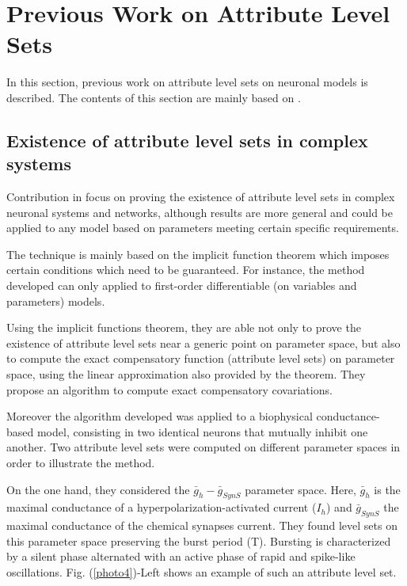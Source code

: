 \chapter{Previous Work on Attribute Level Sets}
\label{sec:prev}
In this section, previous work on attribute level sets on neuronal models is described. The contents of this section are mainly based on \cite{Oly,Rot,Iii2019}. 
\section{Existence of attribute level sets in complex systems}
Contribution in \cite{Oly} focus on proving the existence of attribute level sets in complex neuronal systems and networks, although results are more general and could be applied to any model based on parameters meeting certain specific requirements.

The technique is mainly based on the implicit function theorem which imposes certain conditions which need to be guaranteed. For instance, the method developed can only applied to first-order differentiable (on variables and parameters) models.

Using the implicit functions theorem, they are able not only to prove the existence of attribute level sets near a generic point on parameter space, but also to compute the exact compensatory function (attribute level sets) on parameter space, using the linear approximation also provided by the theorem. They propose an algorithm to compute exact compensatory covariations.

Moreover the algorithm developed was applied to a biophysical conductance-based model, consisting in two identical neurons that mutually inhibit one another. Two attribute level sets were computed on different parameter spaces in order to illustrate the method.

On the one hand, they considered the $\bar{g}_{h}-\bar{g}_{SynS}$ parameter space. Here, $\bar{g}_{h}$ is the maximal conductance of a hyperpolarization-activated current ($I_{h}$) and $\bar{g}_{SynS}$ the maximal conductance of the chemical synapses current. They found level sets on this parameter space preserving the burst period (T). Bursting is characterized by a silent phase alternated with an active phase of rapid and spike-like oscillations. Fig. (\ref{photo4})-Left shows an example of such an attribute level set.

